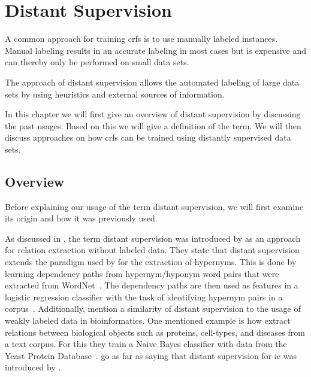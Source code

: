 \chapter{Distant Supervision}\label{cha:distant-supervision}

A common approach for training \glspl{crf} is to use manually labeled instances.
Manual labeling results in an accurate labeling in most cases but is expensive and can thereby only be performed on small data sets.


The approach of \gls{distant supervision} allows the automated labeling of large data sets by using heuristics and external sources of information.

In this chapter we will first give an overview of \gls{distant supervision} by discussing the past usages.
Based on this we will give a definition of the term.
We will then discuss approaches on how \glspl{crf} can be trained using distantly supervised data sets.



\section{Overview}

Before explaining our usage of the term \gls{distant supervision}, we will first examine its origin and how it was previously used.

\bigskip

As discussed in , the term \gls{distant supervision} was introduced by \citet{mintz2009distant} as an approach for relation extraction without labeled data.
They state that \gls{distant supervision} extends the paradigm used by \citet{snow2005learning} for the extraction of hypernyms.
This is done by learning dependency paths from hypernym/hyponym word pairs that were extracted from WordNet~\citep{snow2005learning}.
The dependency paths are then used as features in a logistic regression classifier with the task of identifying hypernym pairs in a corpus~\citep{snow2005learning}.
Additionally, \citet{mintz2009distant} mention a similarity of \gls{distant supervision} to the usage of weakly labeled data in bioinformatics.
One mentioned example is how \citet{craven1999constructing} extract relations between biological objects such as proteins, cell-types, and diseases from a text corpus.
For this they train a Naive Bayes classifier with data from the Yeast Protein Database~\citep{payne1997yeast}.
\citet{surdeanu2012multi} go as far as saying that distant supervision for \gls{ie} was introduced by \citet{craven1999constructing}.

